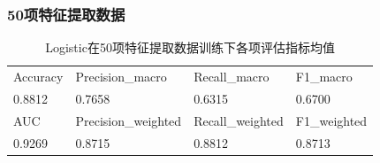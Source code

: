 \documentclass[10pt]{article}
\begin{document}
\subsubsection*{50项特征提取数据}
\begin{table}[H]
  \centering
  \caption{Logistic在50项特征提取数据训练下各项评估指标均值}
  \begin{tabular}{llll}
  \toprule
  Accuracy & Precision\_macro & Recall\_macro & F1\_macro \\
  0.8812 & 0.7658 & 0.6315 & 0.6700 \\
  \midrule
  AUC & Precision\_weighted & Recall\_weighted & F1\_weighted \\
  0.9269 & 0.8715 & 0.8812 & 0.8713 \\
  \bottomrule
  \end{tabular}
\end{table}
\end{document}

